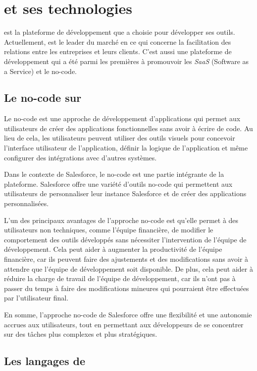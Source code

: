 \documentclass[12pt,oneside,noprintercorrection]{iut}
\begin{document}
\chapter{\slf{} et ses technologies}

\slf{} est la plateforme de développement que \glaz{} a choisie pour développer ses outils. Actuellement, \slf{} est le leader du marché en ce qui concerne la facilitation des relations entre les entreprises et leurs clients. C'est aussi une plateforme de développement qui a été parmi les premières à promouvoir les \textit{SaaS} (Software as a Service) et le no-code.

\section{Le no-code sur \slf{}}
Le no-code est une approche de développement d'applications qui permet aux utilisateurs de créer des applications fonctionnelles sans avoir à écrire de code. Au lieu de cela, les utilisateurs peuvent utiliser des outils visuels pour concevoir l'interface utilisateur de l'application, définir la logique de l'application et même configurer des intégrations avec d'autres systèmes.

Dans le contexte de Salesforce, le no-code est une partie intégrante de la plateforme. Salesforce offre une variété d'outils no-code qui permettent aux utilisateurs de personnaliser leur instance Salesforce et de créer des applications personnalisées.

L'un des principaux avantages de l'approche no-code est qu'elle permet à des utilisateurs non techniques, comme l'équipe financière, de modifier le comportement des outils développés sans nécessiter l'intervention de l'équipe de développement. Cela peut aider à augmenter la productivité de l'équipe financière, car ils peuvent faire des ajustements et des modifications sans avoir à attendre que l'équipe de développement soit disponible. De plus, cela peut aider à réduire la charge de travail de l'équipe de développement, car ils n'ont pas à passer du temps à faire des modifications mineures qui pourraient être effectuées par l'utilisateur final.

En somme, l'approche no-code de Salesforce offre une flexibilité et une autonomie accrues aux utilisateurs, tout en permettant aux développeurs de se concentrer sur des tâches plus complexes et plus stratégiques.

\section{Les langages de \slf{}}
\end{document}
